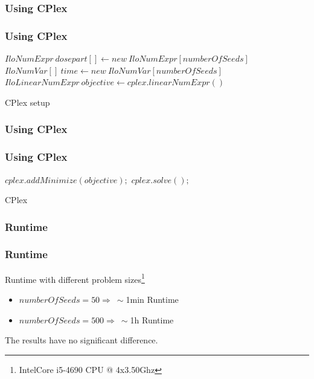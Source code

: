 \documentclass{beamer}
\begin{document}
 \subsubsection{Using CPlex}
 \begin{frame}
 \frametitle{Using CPlex}
 
 \IncMargin{1em}
 \begin{algorithm}[H]
 $IloNumExpr \ dosepart[] \gets new \ IloNumExpr[numberOfSeeds]$\;
 $IloNumVar[] \ time \gets new \ IloNumVar[numberOfSeeds]$\;
 $IloLinearNumExpr \ objective \gets cplex.linearNumExpr()$\;

 \caption{CPlex setup}
 \end{algorithm}
 \DecMargin{1em} 
 
 \end{frame}
 
 \subsubsection*{Using CPlex}
 \begin{frame}
 \frametitle{Using CPlex}
 
 \IncMargin{1em}
 \begin{algorithm}[H]
  $cplex.addMinimize(objective);$
  $cplex.solve();$
 \caption{CPlex}
 \end{algorithm}
 \DecMargin{1em} 
 
 \end{frame}
 
 \subsubsection*{Runtime}
 \begin{frame}
 \frametitle{Runtime}
 Runtime with different problem sizes\footnote{Intel\textregistered  Core i5-4690 CPU @ 4x3.50Ghz}
 
 
\begin{itemize}
\item $numberOfSeeds = 50 \Rightarrow \ \sim $1min Runtime
\item $numberOfSeeds = 500 \Rightarrow \ \sim $1h Runtime
\end{itemize}  
 
 The results have no significant difference.
 
 \end{frame}
 
\end{document}

